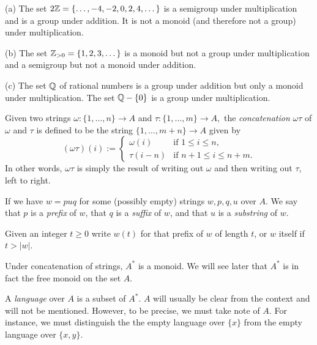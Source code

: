 \begin{egs} (a) The set $2\mathbb{Z} = \{\dots, -4, -2, 0, 2,4,\dots\}$ is a
    semigroup under multiplication and is a group under addition. It
    is not a monoid (and therefore not a group) under multiplication.

    (b) The set $\mathbb{Z}_{>0} = \{1,2,3,\dots\}$ is a monoid but not a group under
    multiplication and a semigroup but not a monoid under addition.

    (c) The set $\mathbb{Q}$ of rational numbers is a group under addition but
    only a monoid under multiplication. The set $\mathbb{Q} - \{0\}$ is a
    group under multiplication.

\end{egs}

\begin{defns} Given two strings $\omega: \{1,\dots,n\} \rightarrow A$
    and $\tau : \{1,\dots,m\} \rightarrow A,$ the \emph{concatenation}
    $\omega \tau$ of $\omega$ and $\tau$ is defined to be the string
    \(\{1,\dots,m+n\} \rightarrow A\) given by
    \[ (\omega\tau)(i) :=
        \begin{cases}
            \omega(i) & \text{if } 1 \le  i \le n, \\
            \tau(i-n) & \text{if } n + 1 \le i \le n+m.
        \end{cases} \] In other words, $\omega\tau$ is simply the
        result of writing out $\omega$ and then writing out $\tau$,
        left to right.

    If we have $w=puq$ for some (possibly empty) strings $w,p,q,u$
    over $A$. We say that $p$ is a \emph{prefix} of $w$, that $q$ is a
    \emph{suffix} of $w$, and that $u$ is a \emph{substring} of $w$.

    Given an integer $t\ge 0$ write $w(t)$ for that prefix of $w$ of
    length $t$, or $w$ itself if $t > |w|$.
\end{defns}

\begin{eg} Under concatenation of strings, $A^*$ is a monoid. We will
    see later that $A^*$ is in fact the free monoid on the set $A$.
\end{eg}

\begin{defn} A \emph{language} over $A$ is a subset of $A^*$. $A$ will
    usually be clear from the context and will not be mentioned.
    However, to be precise, we must take note of $A$. For instance, we
    must distinguish the the empty language over $\{x\}$ from the
    empty language over $\{x,y\}.$
\end{defn}

